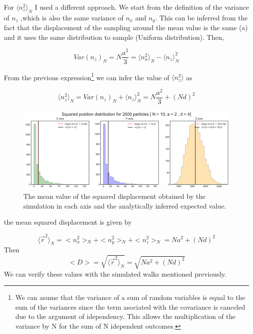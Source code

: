 \documentclass{article}
\begin{document}
For $ \langle n_z^2 \rangle_N$ I used a different approach. We start from the definition of the variance of $n_z$ ,which is also the same variance of $n_x$ and $n_y$. This can be inferred from the fact that the displacement of the sampling around the mean value is the same (a) and it  uses the same distribution to sample (Uniform distribution). Then,

\begin{equation}
    Var(n_z)_N = N\frac{a^2}{3}  =\langle n_x^2 \rangle_N - \langle n_z \rangle^2_N 
\end{equation}

From the previous expression\footnote{We can asume that the variance of a sum of random variables is equal to the sum of the variances since the term asociated with the covariance is canceled due to the argument of idependency. This allows the multiplication of the variance by N for the sum of N idependent outcomes.} we can infer the value of $\langle n_z^2 \rangle$ as

\begin{equation}
    \langle n_z^2 \rangle_N = Var(n_z)_N + \langle n_z \rangle^2_N = N\frac{a^2}{3} + (Nd)^2
\end{equation}

\begin{figure}[h]
\centering
\includegraphics[width=1\textwidth]{imgs/pos2_randomwalk.png}
\caption{ The mean value of the squared displacement obtained by the simulation in each axis and the analytically inferred expected value.}
\end{figure}

the mean squared displacement is given by

\begin{equation}
    \langle \vec{r}^2 \rangle_N = <n_x^2>_N + <n_y^2>_N + <n_z^2>_N = Na^2 + (Nd)^2
\end{equation}
Then
\begin{equation}
    <D> = \sqrt{ \langle \vec{r}^2 \rangle_N} = \sqrt{Na^2 + (Nd)^2}
\end{equation}
We can verify these values with the simulated walks mentioned previously. 
\end{document}
